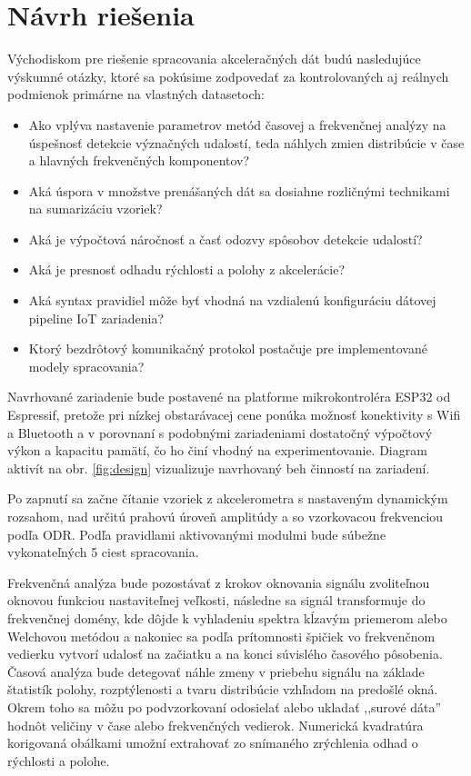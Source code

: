 \chapter{Návrh riešenia}
Východiskom pre riešenie spracovania akceleračných dát budú nasledujúce výskumné otázky, ktoré
sa pokúsime zodpovedať za kontrolovaných aj reálnych podmienok primárne na vlastných datasetoch:

\begin{itemize}[noitemsep]
	\item Ako vplýva nastavenie parametrov metód časovej a frekvenčnej analýzy na úspešnosť detekcie význačných udalostí,
	teda náhlych zmien distribúcie v čase a hlavných frekvenčných komponentov?
	\item Aká úspora v množstve prenášaných dát sa dosiahne rozličnými technikami na sumarizáciu vzoriek?
	\item Aká je výpočtová náročnosť a časť odozvy spôsobov detekcie udalostí?
	\item Aká je presnosť odhadu rýchlosti a polohy z akcelerácie?
	\item Aká syntax pravidiel môže byť vhodná na vzdialenú konfiguráciu dátovej pipeline IoT zariadenia?
	\item Ktorý bezdrôtový komunikačný protokol postačuje pre implementované modely spracovania?
\end{itemize}

Navrhované zariadenie bude postavené na platforme mikrokontroléra ESP32 od Espressif, pretože pri nízkej
obstarávacej cene ponúka možnosť konektivity s Wifi a Bluetooth a v porovnaní s podobnými zariadeniami dostatočný
výpočtový výkon a kapacitu pamätí, čo ho činí vhodný na experimentovanie. Diagram aktivít na obr. \ref{fig:design}
vizualizuje navrhovaný beh činností na zariadení.

Po zapnutí sa začne čítanie vzoriek z akcelerometra s nastaveným dynamickým rozsahom, nad určitú
prahovú úroveň amplitúdy a so vzorkovacou frekvenciou podľa ODR. Podľa pravidlami aktivovanými modulmi bude
súbežne vykonateľných 5 ciest spracovania.

Frekvenčná analýza bude pozostávať z krokov oknovania signálu  zvoliteľnou oknovou funkciou nastaviteľnej veľkosti,
následne sa signál transformuje do frekvenčnej domény,
kde dôjde k vyhladeniu spektra kĺzavým priemerom alebo Welchovou metódou a nakoniec sa podľa prítomnosti špičiek
vo frekvenčnom vedierku vytvorí udalosť na začiatku a na konci súvislého časového pôsobenia. Časová analýza
bude detegovať náhle zmeny v priebehu signálu na základe štatistík polohy, rozptýlenosti a tvaru
distribúcie vzhľadom na predošlé okná. Okrem toho sa môžu po podvzorkovaní odosielať alebo ukladať ,,surové dáta''
hodnôt veličiny v čase alebo frekvenčných vedierok. Numerická kvadratúra korigovaná obálkami umožní extrahovať zo
snímaného zrýchlenia odhad o rýchlosti a polohe.

